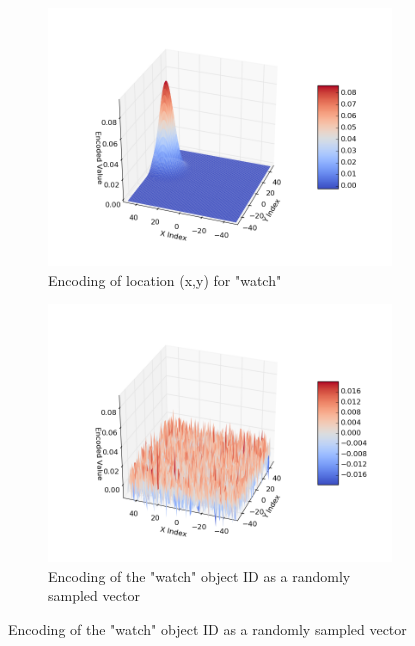 \documentclass[conference]{IEEEtran}
\begin{document}
\begin{figure}[th!]
		\begin{subfigure}{0.45\columnwidth}
			\center
			\includegraphics[width=\linewidth]{img/coord_example_1.png}
			\caption{Encoding of location (x,y) for "watch"}
			\label{fig:encoding-coord}
		\end{subfigure}
		\begin{subfigure}{0.45\columnwidth}
			\center
			\includegraphics[width=\linewidth]{img/coord_example_2.png}
			\caption{Encoding of the "watch" object ID as a randomly sampled vector}
			\label{fig:encoding-object}
		\end{subfigure}
		

\end{figure}
\end{document}

